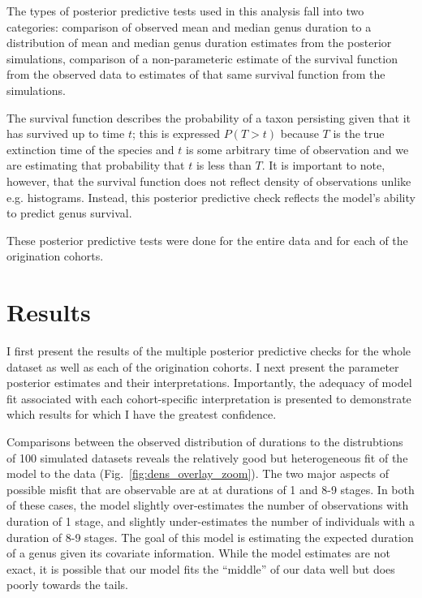 \documentclass[11pt]{article}
\begin{document}
The types of posterior predictive tests used in this analysis fall into two categories: comparison of observed mean and median genus duration to a distribution of mean and median genus duration estimates from the posterior simulations, comparison of a non-parameteric estimate of the survival function from the observed data to estimates of that same survival function from the simulations. 

The survival function describes the probability of a taxon persisting given that it has survived up to time \(t\); this is expressed \(P(T > t)\) because \(T\) is the true extinction time of the species and \(t\) is some arbitrary time of observation and we are estimating that probability that \(t\) is less than \(T\). It is important to note, however, that the survival function does not reflect density of observations unlike e.g. histograms. Instead, this posterior predictive check reflects the model's ability to predict genus survival.

These posterior predictive tests were done for the entire data and for each of the origination cohorts.







\section*{Results}
I first present the results of the multiple posterior predictive checks for the whole dataset as well as each of the origination cohorts. I next present the parameter posterior estimates and their interpretations. Importantly, the adequacy of model fit associated with each cohort-specific interpretation is presented to demonstrate which results for which I have the greatest confidence.


Comparisons between the observed distribution of durations to the distrubtions of 100 simulated datasets reveals the relatively good but heterogeneous fit of the model to the data (Fig.~\ref{fig:dens_overlay_zoom}). The two major aspects of possible misfit that are observable are at at durations of 1 and 8-9 stages. In both of these cases, the model slightly over-estimates the number of observations with duration of 1 stage, and slightly under-estimates the number of individuals with a duration of 8-9 stages. The goal of this model is estimating the expected duration of a genus given its covariate information. While the model estimates are not exact, it is possible that our model fits the ``middle'' of our data well but does poorly towards the tails. 
\end{document}
